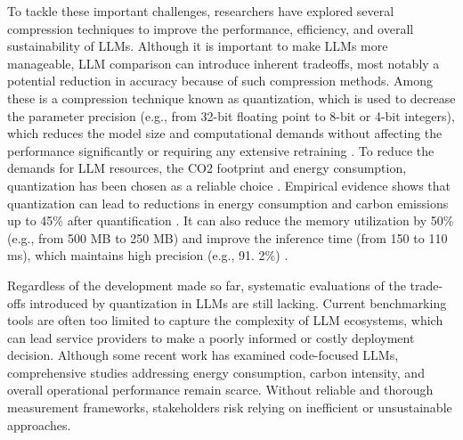 To tackle these important challenges, researchers have explored several compression techniques to improve the performance, efficiency, and overall sustainability of LLMs. Although it is important to make LLMs more manageable, LLM comparison can introduce inherent tradeoffs, most notably a potential reduction in accuracy because of such compression methods. Among these is a compression technique known as quantization, which is used to decrease the parameter precision (e.g., from 32-bit floating point to 8-bit or 4-bit integers), which reduces the model size and computational demands without affecting the performance significantly or requiring any extensive retraining \cite{DBLP:journals/corr/abs-2507-09665} \cite{10968787}. To reduce the demands for LLM resources, the CO2 footprint and energy consumption, quantization has been chosen as a reliable choice \cite{DBLP:journals/corr/abs-2507-09665}. Empirical evidence shows that quantization can lead to reductions in energy consumption and carbon emissions up to 45\% after quantification \cite{DBLP:journals/corr/abs-2504-06307}. It can also reduce the memory utilization by 50\% (e.g., from 500 MB to 250 MB) and improve the inference time (from 150 to 110 ms), which maintains high precision (e.g., 91. 2\%)  \cite{10968787}. 


Regardless of the development made so far, systematic evaluations of the trade-offs introduced by quantization in LLMs are still lacking. Current benchmarking tools are often too limited to capture the complexity of LLM ecosystems, which can lead service providers to make a poorly informed or costly deployment decision\cite{10968787}.  Although some recent work has examined code-focused LLMs, comprehensive studies addressing energy consumption, carbon intensity, and overall operational performance remain scarce. Without reliable and thorough measurement frameworks, stakeholders risk relying on inefficient or unsustainable approaches.

